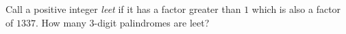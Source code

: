 Call a positive integer \emph{leet} if it has a factor greater than $1$ which is also a factor of $1337$. How many $3$-digit palindromes are leet?
